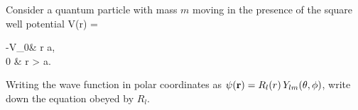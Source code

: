 \newcommand{\Vo}{V_0}
\newcommand{\vr}{\vb{r}}
\newcommand{\Rl}{R_l}
\newcommand{\Ylm}{Y_{l m}}
\newcommand{\Rlr}{\Rl(r)}
\newcommand{\vep}{\varepsilon}
\newcommand{\del}{\delta}
\newcommand{\dell}{\del_l}
\newcommand{\delo}{\del_0}
\newcommand{\Al}{A_l}
\newcommand{\Ao}{A_0}
\newcommand{\Bo}{B_0}
\newcommand{\absr}{\abs{r}}

\newcommand{\tsc}{\text{sc}}
\newcommand{\asc}{a_\tsc}
\newcommand{\kap}{\kappa}
\newcommand{\avep}{\abs{\vep}}

\newcommand{\betal}{\beta_l}
\newcommand{\psiE}{\psi_E}
\newcommand{\uE}{u_E}
\newcommand{\El}{E_l}
\newcommand{\eff}{\text{eff}}
\newcommand{\Veff}{V_\eff}

\newcommand{\jl}{j_l}
\newcommand{\jo}{j_0}
\newcommand{\nl}{n_l}
\newcommand{\no}{n_0}
\newcommand{\hlq}{h_l^{(1)}}
\newcommand{\hoq}{h_0^{(1)}}
\newcommand{\Ro}{R_0}
\newcommand{\betao}{\beta_0}
\newcommand{\constant}{\text{constant }}

\newcommand{\dcx}{\dd[3]{x}}
\newcommand{\intoi}{\int_0^\infty}
\newcommand{\intoa}{\int_0^a}
\newcommand{\intai}{\int_a^\infty}
\newcommand{\dr}{\dd{r}}


\clearpage
\begin{statement}{}
	Consider a quantum particle with mass $m$ moving in the presence of the square well potential
	\beq
		V(r) = \begin{cases}
			-\Vo & r \leq a, \\
			0 & r > a.
		\end{cases}
	\eeq
	\vfix
\end{statement}

\begin{problem}
	Writing the wave function in polar coordinates as $\psi(\vr) = \Rlr \, \Ylm(\tht, \phi)$, write down the {\Schrodinger} equation obeyed by $\Rl$.
\end{problem}

